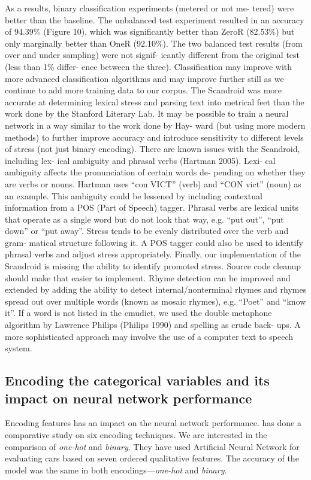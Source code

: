 \documentclass[12pt]{report}
\begin{document}
As a results, binary classification experiments (metered or not me- tered) were
better than the baseline. The unbalanced test experiment resulted in an accuracy
of 94.39\% (Figure 10), which was significantly better than ZeroR (82.53\%) but
only marginally better than OneR (92.10\%). The two balanced test results (from
over and under sampling) were not signif- icantly different from the original
test (less than 1\% differ- ence between the three). Classification may improve
with more advanced classification algorithms and may improve further still as we
continue to add more training data to our corpus.  The Scandroid was more
accurate at determining lexical stress and parsing text into metrical feet than
the work done by the Stanford Literary Lab. It may be possible to train a neural
network in a way similar to the work done by Hay- ward (but using more modern
methods) to further improve accuracy and introduce sensitivity to different
levels of stress (not just binary encoding).  There are known issues with the
Scandroid, including lex- ical ambiguity and phrasal verbs (Hartman 2005). Lexi-
cal ambiguity affects the pronunciation of certain words de- pending on whether
they are verbs or nouns. Hartman uses “con VICT” (verb) and “CON vict” (noun) as
an example. This ambiguity could be lessened by including contextual information
from a POS (Part of Speech) tagger. Phrasal verbs are lexical units that operate
as a single word but do not look that way, e.g. “put out”, “put down” or “put
away”. Stress tends to be evenly distributed over the verb and gram- matical
structure following it. A POS tagger could also be used to identify phrasal verbs
and adjust stress appropriately. Finally, our implementation of the Scandroid is
missing the ability to identify promoted stress. Source code cleanup should make
that easier to implement. Rhyme detection can be improved and extended by adding
the ability to detect internal/nonterminal rhymes and rhymes spread out over
multiple words (known as mosaic rhymes), e.g. “Poet” and “know it”. If a word is
not listed in the cmudict, we used the double metaphone algorithm by Lawrence
Philips (Philips 1990) and spelling as crude back- ups. A more sophisticated
approach may involve the use of a computer text to speech system.


\subsection*{Encoding the categorical variables and  its impact on neural network performance}
Encoding features has an impact on the neural network performance.
\citet{Potdar2017} has done a comparative study on six encoding techniques.  We
are interested in the comparison of \textit{one-hot} and \textit{binary}. They
have used Artificial Neural Network for evaluating cars based on seven ordered
qualitative features. The accuracy of the model was the same in both
encodings---\textit{one-hot} and \textit{binary}.
\end{document}
